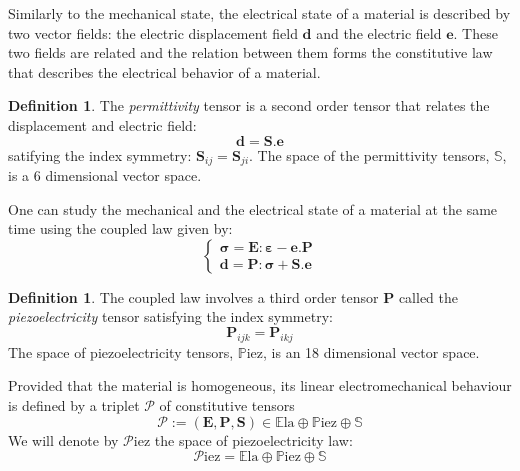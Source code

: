 \documentclass[11pt,a4paper]{amsart}
\theoremstyle{definition}
\newtheorem{defn}[thm]{Definition}
\newcommand{\Ela}{\mathbb{E}\mathrm{la}}    %
\newcommand{\Piez}{\mathbb{P}\mathrm{iez}}  %
\newcommand{\Sym}{\mathbb{S}}               %
\newcommand{\1}{\mathds{1}}		            %
\newcommand{\bS}{\mathbf{S}}
\newcommand{\bE}{\mathbf{E}}                %
\newcommand{\bP}{\mathbf{P}}                %
\newcommand{\bsigma}{\mathbf{\sigma}}       %
\newcommand{\beps}{\mathbf{\varepsilon}}
\newcommand{\bd}{\mathbf{d}}
\newcommand{\be}{\mathbf{e}}
\begin{document}
\par Similarly to the mechanical state, the electrical state of a material is described by two vector fields: the electric displacement field $\bd$ and the electric field $\be$. These two fields are related and the relation between them forms the constitutive law that describes the electrical behavior of a material.

\begin{defn}
The \emph{permittivity} tensor is a second order tensor that relates the displacement and electric field:
\begin{equation*}
\bd=\bS.\be
\end{equation*}
satifying the index symmetry: $\bS_{ij}=\bS_{ji}$.
The space of the permittivity tensors, $\Sym$, is a 6 dimensional vector space.
\end{defn}

\par One can study the mechanical and the electrical state of a material at the same time using the coupled law given by:
\begin{equation*}
\begin{cases}
\bsigma=\bE:\beps-\be.\bP\\
\bd=\bP:\bsigma+\bS.\be
\end{cases}
\end{equation*}

\begin{defn}
The coupled law involves a third order tensor $\bP$ called the \emph{piezoelectricity} tensor satisfying the index symmetry:
\begin{equation*}
\bP_{ijk}=\bP_{ikj}
\end{equation*}
The space of piezoelectricity tensors, $\Piez$, is an 18 dimensional vector space.
\end{defn}

\par Provided that the material is homogeneous, its linear electromechanical behaviour is
defined by a triplet $\mathcal{P}$ of constitutive tensors
\begin{equation*}
\mathcal{P}:=(\bE,\bP,\bS)\in \Ela \oplus \Piez \oplus \Sym
\end{equation*}
We will denote by $\mathcal{P}$iez the space of piezoelectricity law:
\begin{equation*}
\mathcal{P}\text{iez}=\Ela \oplus \Piez \oplus \Sym
\end{equation*}


\end{document}
